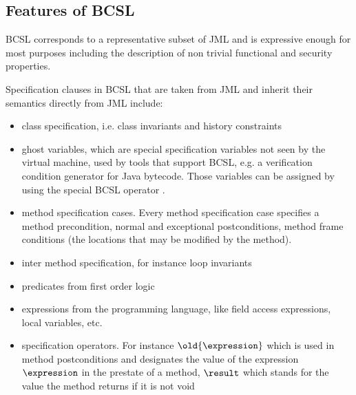 


\subsection{Features of BCSL} \label{BCSLgrammar}


BCSL corresponds to a representative subset of JML and is expressive enough for most purposes including the description of non trivial functional and 
 security properties.

 Specification clauses in BCSL that are taken from JML and inherit their semantics directly from JML include:
\begin{itemize}
   \item class specification, i.e. class invariants and history constraints
   \item ghost variables, which are special specification variables not seen by the virtual machine, used by tools that support BCSL,
    e.g. a verification condition generator for Java bytecode. Those variables can be assigned by using the special BCSL operator \set.
   \item  method specification cases. Every method specification case specifies
         a method precondition, normal and exceptional postconditions, method frame conditions (the locations that may be modified by the method).
	 
   \item inter method specification, for instance loop invariants
   \item predicates from first order logic   
      
   \item expressions from the programming language, like field access expressions, local variables, etc.
   
   \item specification operators. For instance  $\old{\expression}$ which is used in method postconditions and
 designates the value of the expression $\expression$ in the prestate of a method, $ \result$ which stands for the value the method
returns if it is not void  

\end{itemize}


